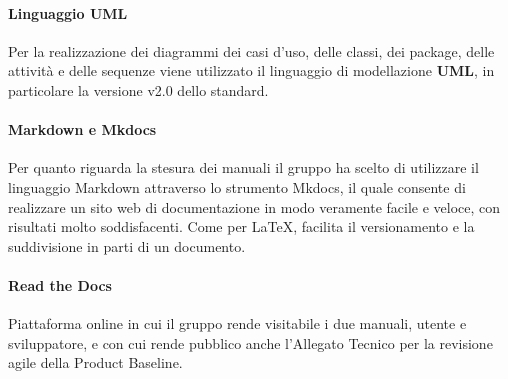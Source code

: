 \paragraph*{Linguaggio UML}
Per la realizzazione dei diagrammi dei casi d'uso, delle classi, dei package, delle attività e delle sequenze viene utilizzato il linguaggio di modellazione \textbf{UML}, in particolare la versione v2.0 dello standard.

\paragraph*{Markdown e Mkdocs}
Per quanto riguarda la stesura dei manuali il gruppo ha scelto di utilizzare il linguaggio Markdown attraverso lo strumento Mkdocs, il quale consente di realizzare un sito web di documentazione in modo veramente facile e veloce, con risultati molto soddisfacenti. Come per \LaTeX{}, facilita il versionamento e la suddivisione in parti di un documento.

\paragraph*{Read the Docs}
Piattaforma online in cui il gruppo rende visitabile i due manuali, utente e sviluppatore, e con cui rende pubblico anche l'Allegato Tecnico per la revisione agile della Product Baseline.

